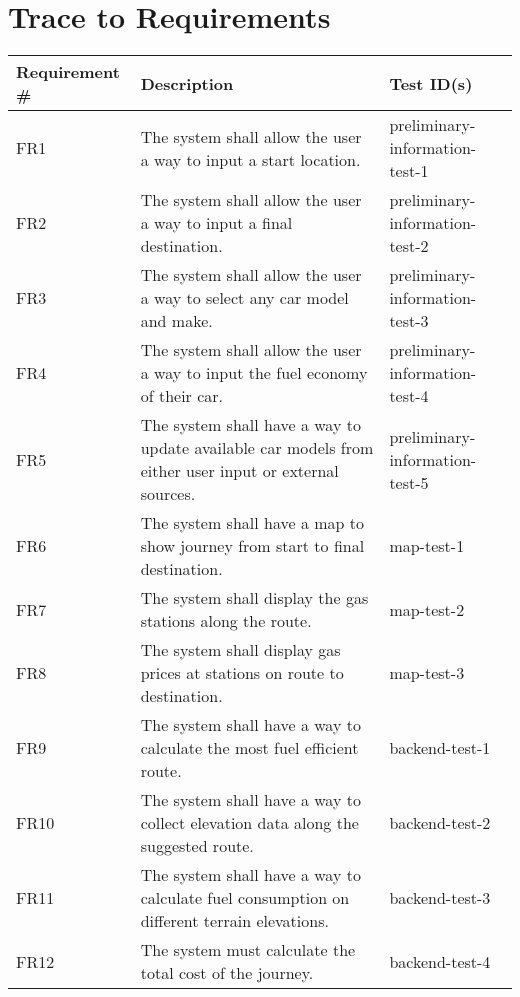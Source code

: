 \documentclass[12pt, titlepage]{article}
\begin{document}
\section{Trace to Requirements}
  \begin{table}[h!]
	
	\begin{tabular}{|p{3.5cm}|p{6.5cm}|p{4.5cm}|}

	\hline
	\textbf{Requirement \#} & \textbf{Description}   &\textbf{Test ID(s)}  \\ \hline
	FR1 & The system shall allow the user a way to input a start location.    & preliminary-information-test-1  \\ \hline
	FR2 & The system shall allow the user a way to input a final destination.   & preliminary-information-test-2   \\ \hline
	FR3 & The system shall allow the user a way to select any car model and make.    & preliminary-information-test-3 \\ \hline
	FR4 & The system shall allow the user a way to input the fuel economy of their car.  & preliminary-information-test-4 \\ \hline
	FR5 & The system shall have a way to update available car models from either user input or external sources. & preliminary-information-test-5  \\ \hline
	FR6 & The system shall have a map to show journey from start to final destination. & map-test-1 \\ \hline
	FR7 & The system shall display the gas stations along the route.     & map-test-2  \\ \hline
	FR8 & The system shall display gas prices at stations on route to destination. & map-test-3  \\ \hline
	FR9 & The system shall have a way to calculate the most fuel efficient route.   & backend-test-1 \\ \hline
	FR10 & The system shall have a way to collect elevation data along the suggested route. & backend-test-2 \\ \hline
	FR11 & The system shall have a way to calculate fuel consumption on different terrain elevations. & backend-test-3 \\ \hline
	FR12 & The system must calculate the total cost of the journey.  & backend-test-4 \\ \hline
	
	\end{tabular}
	
  \end{table}
\end{document}
